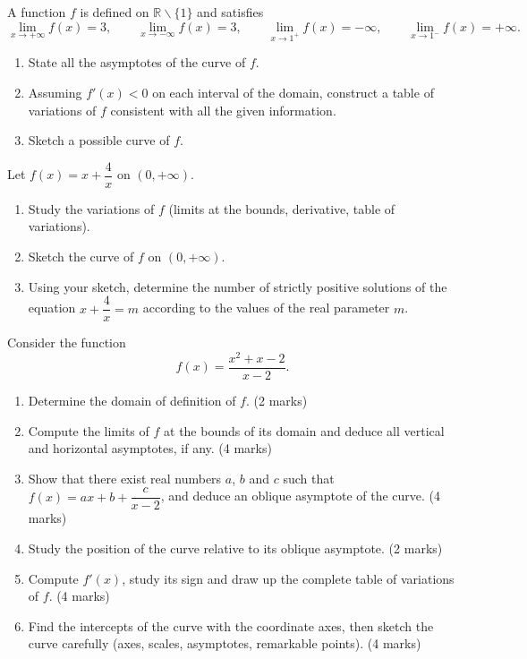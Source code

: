 \documentclass[11pt]{article}
\newcounter{popsec}
\newcounter{popsub}
\newcommand{\courssub}[1]{%
  \stepcounter{popsub}%
  \par\vspace{9pt}\noindent{\popxbold\fontsize{11.5}{13}\selectfont\color{popink}{\color{poporange}\thepopsec.\thepopsub}\hspace{6pt}#1}\par\nopagebreak\vspace{4pt}
}
\def\setminus{\mathbin{\backslash}}\let\smallsetminus\setminus
\begin{document}
\begin{exercice}
A function $f$ is defined on $\mathbb{R}\setminus\{1\}$ and satisfies
\[ \lim_{x\to +\infty}f(x)=3,\qquad \lim_{x\to -\infty}f(x)=3,\qquad \lim_{x\to 1^{+}}f(x)=-\infty,\qquad \lim_{x\to 1^{-}}f(x)=+\infty. \]
\begin{enumerate}
\item State all the asymptotes of the curve of $f$.
\item Assuming $f'(x)<0$ on each interval of the domain, construct a table of variations of $f$ consistent with all the given information.
\item Sketch a possible curve of $f$.
\end{enumerate}
\end{exercice}

\begin{exercice}
Let $f(x)=x+\dfrac{4}{x}$ on $(0,+\infty)$.
\begin{enumerate}
\item Study the variations of $f$ (limits at the bounds, derivative, table of variations).
\item Sketch the curve of $f$ on $(0,+\infty)$.
\item Using your sketch, determine the number of strictly positive solutions of the equation $x+\dfrac{4}{x}=m$ according to the values of the real parameter $m$.
\end{enumerate}
\end{exercice}

\courssub{I prepare for the GCE}

\begin{exercice}
Consider the function
\[ f(x)=\frac{x^{2}+x-2}{x-2}. \]
\begin{enumerate}
\item Determine the domain of definition of $f$. \hfill (2 marks)
\item Compute the limits of $f$ at the bounds of its domain and deduce all vertical and horizontal asymptotes, if any. \hfill (4 marks)
\item Show that there exist real numbers $a$, $b$ and $c$ such that $f(x)=ax+b+\dfrac{c}{x-2}$, and deduce an oblique asymptote of the curve. \hfill (4 marks)
\item Study the position of the curve relative to its oblique asymptote. \hfill (2 marks)
\item Compute $f'(x)$, study its sign and draw up the complete table of variations of $f$. \hfill (4 marks)
\item Find the intercepts of the curve with the coordinate axes, then sketch the curve carefully (axes, scales, asymptotes, remarkable points). \hfill (4 marks)
\end{enumerate}
\end{exercice}
\end{document}
